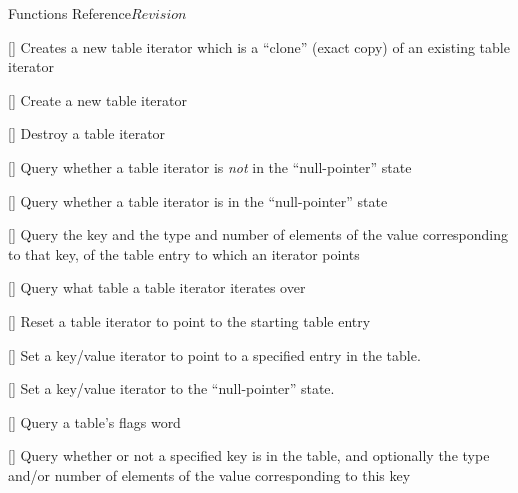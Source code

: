 \begin{cactuspart}{ Functions Reference}{}{$Revision$}
\begin{Lentry}
\item[\code{Util\_TableItClone}]
     [\pageref{Util-TableItClone}]
Creates a new table iterator which is a ``clone'' (exact copy) of an
existing table iterator

\item[\code{Util\_TableItCreate}]
     [\pageref{Util-TableItCreate}]
Create a new table iterator

\item[\code{Util\_TableItDestroy}]
     [\pageref{Util-TableItDestroy}]
Destroy a table iterator

\item[\code{Util\_TableItQueryIsNonNull}]
     [\pageref{Util-TableItQueryIsNonNull}]
Query whether a table iterator is {\em not\/} in the ``null-pointer'' state

\item[\code{Util\_TableItQueryIsNull}]
     [\pageref{Util-TableItQueryIsNull}]
Query whether a table iterator is in the ``null-pointer'' state

\item[\code{Util\_TableItQueryKeyValueInfo}]
     [\pageref{Util-TableItQueryKeyValueInfo}]
Query the key and the type and number of elements of the value
corresponding to that key, of the table entry to which an iterator points

\item[\code{Util\_TableItQueryTableHandle}]
     [\pageref{Util-TableItQueryTableHandle}]
Query what table a table iterator iterates over

\item[\code{Util\_TableItResetToStart}]
     [\pageref{Util-TableItResetToStart}]
Reset a table iterator to point to the starting table entry

\item[\code{Util\_TableItSetToKey}]
     [\pageref{Util-TableItSetToKey}]
Set a key/value iterator to point to a specified entry in the table.

\item[\code{Util\_TableItSetToNull}]
     [\pageref{Util-TableItSetToNull}]
Set a key/value iterator to the ``null-pointer'' state.

\item[\code{Util\_TableQueryFlags}]
     [\pageref{Util-TableQueryFlags}]
Query a table's flags word

\item[\code{Util\_TableQueryValueInfo}]
     [\pageref{Util-TableQueryValueInfo}]
Query whether or not a specified key is in the table, and optionally
the type and/or number of elements of the value corresponding to this key


\end{Lentry}
\end{cactuspart}
